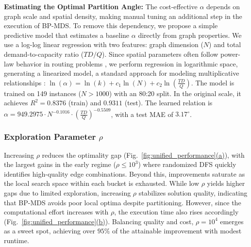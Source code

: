 \textbf{Estimating the Optimal Partition Angle:} The cost-effective $\alpha$ depends on graph scale and spatial density, making manual tuning an additional step in the execution of BP-MDS. To remove this dependency, we propose a simple predictive model that estimates a baseline $\alpha$ directly from graph properties. We use a log-log linear regression with two features: graph dimension ($N$) and total demand-to-capacity ratio ($TD/Q$). Since spatial parameters often follow power-law behavior in routing problems \cite{daganzo1984distance}, we perform regression in logarithmic space, generating a linearized model, a standard approach for modeling multiplicative relationships \cite{hastie2009elements}: $\ln(\alpha) = \ln(k) + c_1 \ln(N) + c_2 \ln\left(\frac{TD}{Q}\right)$. The model is trained on 149 instances ($N > 1000$) with an 80:20 split. In the original scale, it achieves $R^2=0.8376$ (train) and $0.9311$ (test). The learned relation is $\alpha = 949.2975 \cdot N^{-0.1016} \cdot \left(\frac{TD}{Q}\right)^{-0.5509}$, with a test MAE of $3.17^\circ$. 


\subsubsection{\textbf{Exploration Parameter $\rho$}} Increasing $\rho$ reduces the optimality gap (Fig.~\hyperref[fig:unified_performance]{\ref*{fig:unified_performance}(a)}), with the largest gains in the early regime ($\rho \le 10^3$) where randomized DFS quickly identifies high-quality edge combinations. Beyond this, improvements saturate as the local search space within each bucket is exhausted. While low $\rho$ yields higher gaps due to limited exploration, increasing $\rho$ stabilizes solution quality, indicating that BP-MDS avoids poor local optima despite partitioning. However, since the computational effort increases with $\rho$, the execution time also rises accordingly (Fig.~\hyperref[fig:unified_performance]{\ref*{fig:unified_performance}(b)}). Balancing quality and cost, $\rho = 10^4$ emerges as a sweet spot, achieving over $95\%$ of the attainable improvement with modest runtime. 

